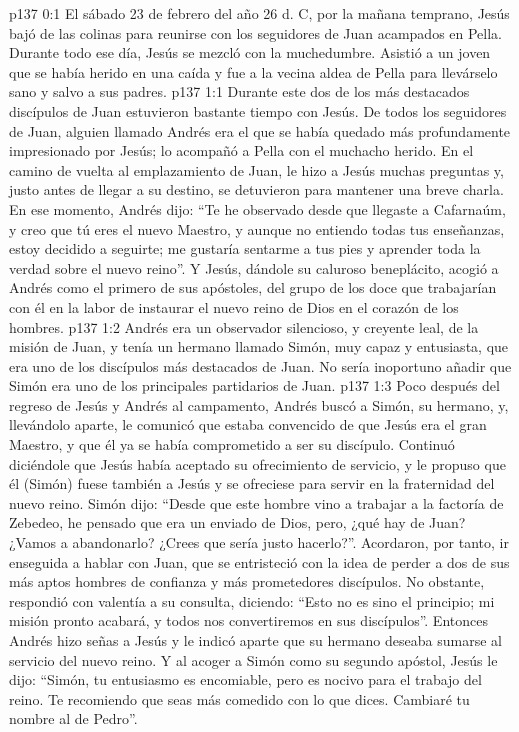 \author{Comisión de seres intermedios}
\vs p137 0:1 El sábado 23 de febrero del año 26 d. C, por la mañana temprano, Jesús bajó de las colinas para reunirse con los seguidores de Juan acampados en Pella. Durante todo ese día, Jesús se mezcló con la muchedumbre. Asistió a un joven que se había herido en una caída y fue a la vecina aldea de Pella para llevárselo sano y salvo a sus padres.
\vs p137 1:1 Durante este  dos de los más destacados discípulos de Juan estuvieron bastante tiempo con Jesús. De todos los seguidores de Juan, alguien llamado Andrés era el que se había quedado más profundamente impresionado por Jesús; lo acompañó a Pella con el muchacho herido. En el camino de vuelta al emplazamiento de Juan, le hizo a Jesús muchas preguntas y, justo antes de llegar a su destino, se detuvieron para mantener una breve charla. En ese momento, Andrés dijo: “Te he observado desde que llegaste a Cafarnaúm, y creo que tú eres el nuevo Maestro, y aunque no entiendo todas tus enseñanzas, estoy decidido a seguirte; me gustaría sentarme a tus pies y aprender toda la verdad sobre el nuevo reino”. Y Jesús, dándole su caluroso beneplácito, acogió a Andrés como el primero de sus apóstoles, del grupo de los doce que trabajarían con él en la labor de instaurar el nuevo reino de Dios en el corazón de los hombres.
\vs p137 1:2 \pc Andrés era un observador silencioso, y creyente leal, de la misión de Juan, y tenía un hermano llamado Simón, muy capaz y entusiasta, que era uno de los discípulos más destacados de Juan. No sería inoportuno añadir que Simón era uno de los principales partidarios de Juan.
\vs p137 1:3 Poco después del regreso de Jesús y Andrés al campamento, Andrés buscó a Simón, su hermano, y, llevándolo aparte, le comunicó que estaba convencido de que Jesús era el gran Maestro, y que él ya se había comprometido a ser su discípulo. Continuó diciéndole que Jesús había aceptado su ofrecimiento de servicio, y le propuso que él (Simón) fuese también a Jesús y se ofreciese para servir en la fraternidad del nuevo reino. Simón dijo: “Desde que este hombre vino a trabajar a la factoría de Zebedeo, he pensado que era un enviado de Dios, pero, ¿qué hay de Juan? ¿Vamos a abandonarlo? ¿Crees que sería justo hacerlo?”. Acordaron, por tanto, ir enseguida a hablar con Juan, que se entristeció con la idea de perder a dos de sus más aptos hombres de confianza y más prometedores discípulos. No obstante, respondió con valentía a su consulta, diciendo: “Esto no es sino el principio; mi misión pronto acabará, y todos nos convertiremos en sus discípulos”. Entonces Andrés hizo señas a Jesús y le indicó aparte que su hermano deseaba sumarse al servicio del nuevo reino. Y al acoger a Simón como su segundo apóstol, Jesús le dijo: “Simón, tu entusiasmo es encomiable, pero es nocivo para el trabajo del reino. Te recomiendo que seas más comedido con lo que dices. Cambiaré tu nombre al de Pedro”.
